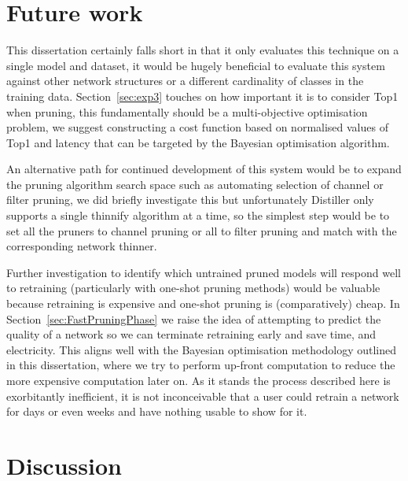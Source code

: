 \documentclass[../Dissertation.tex]{subfiles}
\begin{document}
\section{Future work}

This dissertation certainly falls short in that it only evaluates this technique on a single model and dataset, it would be hugely beneficial to evaluate this system against other network structures or a different cardinality of classes in the training data.
Section~\ref{sec:exp3} touches on how important it is to consider Top1 when pruning, this fundamentally should be a multi-objective optimisation problem, we suggest constructing a cost function based on normalised values of Top1 and latency that can be targeted by the Bayesian optimisation algorithm.

An alternative path for continued development of this system would be to expand the pruning algorithm search space such as automating selection of channel or filter pruning, we did briefly investigate this but unfortunately Distiller only supports a single thinnify algorithm at a time, so the simplest step would be to set all the pruners to channel pruning or all to filter pruning and match with the corresponding network thinner.

Further investigation to identify which untrained pruned models will respond well to retraining (particularly with one-shot pruning methods) would be valuable because retraining is expensive and one-shot pruning is (comparatively) cheap.
In Section~\ref{sec:FastPruningPhase} we raise the idea of attempting to predict the quality of a network so we can terminate retraining early and save time, and electricity.
This aligns well with the Bayesian optimisation methodology outlined in this dissertation, where we try to perform up-front computation to reduce the more expensive computation later on. 
As it stands the process described here is exorbitantly inefficient, it is not inconceivable that a user could retrain a network for days or even weeks and have nothing usable to show for it.

\section{Discussion}
\end{document}

